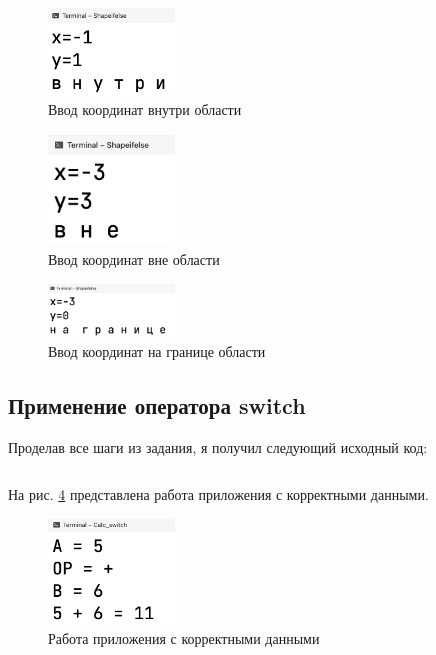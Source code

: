 \documentclass[a4paper,14pt]{extarticle}
\numberwithin{figure}{section}
\begin{document}
\begin{figure}[H]
    \centering
    \includegraphics[width=0.3\textwidth]{images/task-1-1.png}
    \caption{Ввод координат внутри области}
    \label{fig:task-1-1}
\end{figure}

\begin{figure}[H]
    \centering
    \includegraphics[width=0.3\textwidth]{images/task-1-2.png}
    \caption{Ввод координат вне области}
    \label{fig:task-1-2}
\end{figure}

\begin{figure}[H]
    \centering
    \includegraphics[width=0.3\textwidth]{images/task-1-3.png}
    \caption{Ввод координат на границе области}
    \label{fig:task-1-3}
\end{figure}

\subsection{Применение оператора switch}

Проделав все шаги из задания, я получил следующий исходный код:
\inputminted{csharp}{../Calc_switch/Calc_switch/Program.cs}

На рис. \ref{fig:task-2-1} представлена работа приложения с корректными данными.

\begin{figure}[H]
    \centering
    \includegraphics[width=0.3\textwidth]{images/task-2-1.png}
    \caption{Работа приложения с корректными данными}
    \label{fig:task-2-1}
\end{figure}
\end{document}
